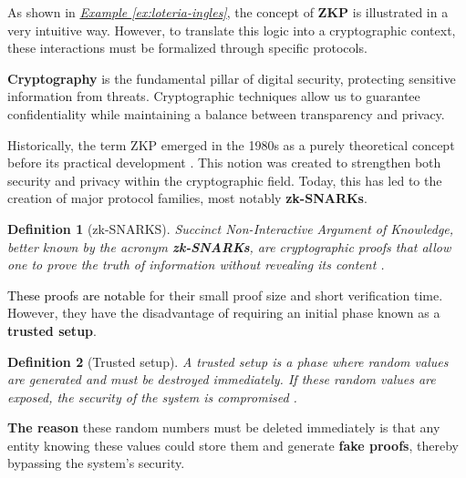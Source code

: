 \documentclass[a4paper,12pt]{report}
\newtheorem{definition}{Definition}
\begin{document}
	\noindent As shown in \hyperref[ex:loteria-ingles]{\textit{Example \ref{ex:loteria-ingles}}}, the concept of \textbf{ZKP} is illustrated in a very intuitive way. However, to translate this logic into a cryptographic context, these interactions must be formalized through specific protocols.
	
	\vspace{0.25cm}
	
	\noindent \textbf{Cryptography} is the fundamental pillar of digital security, protecting sensitive information from threats. Cryptographic techniques allow us to guarantee confidentiality while maintaining a balance between transparency and privacy.
	
	\vspace{0.25cm}
	
	\noindent Historically, the term ZKP emerged in the 1980s as a purely theoretical concept before its practical development \cite{nervos_zkp}. This notion was created to strengthen both security and privacy within the cryptographic field. Today, this has led to the creation of major protocol families, most notably \textbf{zk-SNARKs}.
	
	
	\begin{definition}[zk-SNARKS]
		
		\noindent \textit{Succinct Non-Interactive Argument of Knowledge}, better known by the acronym \textbf{zk-SNARKs}, are cryptographic proofs that allow one to prove the truth of information without revealing its content \cite{binance_academy_zk-ingles}.
		
		\label{def:zk-snarks-ingles}
	\end{definition}
	
	\vspace{0.25cm}
	\noindent \textcolor{black}{These proofs are notable} for their small proof size and short verification time. However, they have the disadvantage of requiring an initial phase known as a \textbf{trusted setup}.
	
	\begin{definition}[Trusted setup]
		
		\noindent A trusted setup is a phase where random values are generated and must be destroyed immediately. If these random values are exposed, the security of the system is compromised \cite{binance_academy_zk}.
		
		
		\label{def:confidence-configuration-ingles}
	\end{definition}
	
	
	\noindent \textbf{The reason} these random numbers must be deleted immediately is that any entity knowing these values could store them and generate \textbf{fake proofs}, thereby bypassing the system's security.
	
\end{document}
